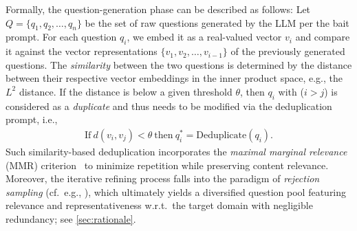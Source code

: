 Formally, the question-generation phase can be described as follows:
Let $Q = \{q_1, q_2, \ldots, q_n\}$ be the set of raw questions generated by the LLM per the bait prompt. For each question $q_i$, we embed it as a real-valued vector $v_i$ and compare it against the vector representations $\{v_1, v_2, \dots, v_{i-1}\}$ of the previously generated questions. The \emph{similarity} between the two questions is determined by the distance between their respective vector embeddings in the inner product space, e.g., the $L^2$ distance.
If the distance is below a given threshold \( \theta \), then \( q_i \) with ($i > j$) is considered as a \emph{duplicate} and thus needs to be modified via the deduplication prompt, i.e.,
\begin{align}\label{eq:deduplication}
\text{If} \  d\left(v_i, v_j\right) < \theta \  \text{then}\ q_i^* = \text{Deduplicate}\left(q_i\right).\tag{$\dagger$}
\end{align}%
Such similarity-based deduplication incorporates the \emph{maximal marginal relevance} (MMR) criterion~\cite{DBLP:conf/sigir/CarbonellG98} to minimize repetition while preserving content relevance. Moreover, the iterative refining process falls into the paradigm of \emph{rejection sampling} (cf.\ e.g., \cite{liu2001monte}), which ultimately yields a diversified question pool featuring relevance and representativeness w.r.t.\ the target domain with negligible redundancy; see \cref{sec:rationale}.

